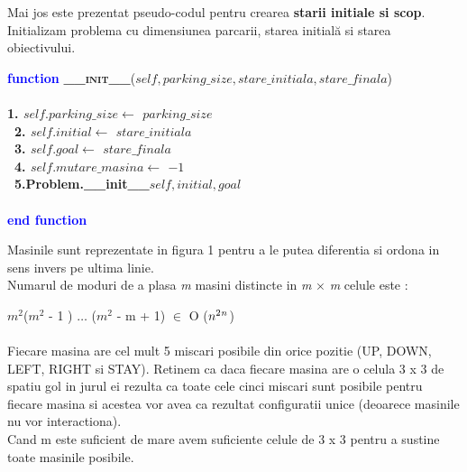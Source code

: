 \documentclass{article}
\begin{document}
\newpage
\quad Mai jos este prezentat pseudo-codul pentru crearea \textbf{starii initiale si scop}. \\
Initializam problema cu dimensiunea parcarii, starea initială si starea obiectivului.\par
\vspace{6mm}
\begin{center}
\begin{tabbing}
\large
\indent\textbf{\textcolor{blue}{func}}\=\textbf{\textcolor{blue}{tion}}
\textsc{\bfseries{\_\_init\_\_}}{($self, parking\_size, stare\_initiala, stare\_finala$)}\\\\ 
\bfseries{1.}\indent \> $self.parking\_size \leftarrow$ $parking\_size$ \\\
\bfseries{2.}\indent \> $self.initial \leftarrow$ $stare\_initiala$ \\\
\bfseries{3.}\indent \> $self.goal \leftarrow$ $stare\_finala$\\\
\bfseries{4.}\indent \> $self.mutare\_masina \leftarrow$ $-1$ \\\
\bfseries{5.}\indent \>\bfseries Problem.\_\_init\_\_{$self, initial, goal$}\\\\
\indent\textbf{\textcolor{blue}{end }}\=\textbf{\textcolor{blue}{function}}
\end{tabbing}
\end{center}
\quad Masinile sunt reprezentate in figura 1  pentru a le putea diferentia si ordona in sens invers pe ultima linie. \\
 Numarul de moduri de a plasa \emph m masini distincte in \emph m × \emph m celule este : \par
 \vspace{6mm}
\(m^2\)(\(m^2\) - 1 ) $\dots$ (\(m^2\) - m + 1) \(\in\) O (\(n^2\*^n\)) \\\\
\newline
\quad Fiecare masina are cel mult 5 miscari posibile din orice pozitie (UP, DOWN, LEFT, RIGHT si STAY). Retinem ca daca fiecare masina are o celula 3 x 3 de spatiu gol in jurul ei rezulta ca toate cele cinci miscari sunt posibile pentru fiecare masina si acestea vor avea ca rezultat configuratii unice (deoarece masinile nu vor interactiona).\\
Cand m este suficient de mare avem suficiente celule de 3 x 3 pentru a sustine toate masinile posibile.\\\\
\end{document}
